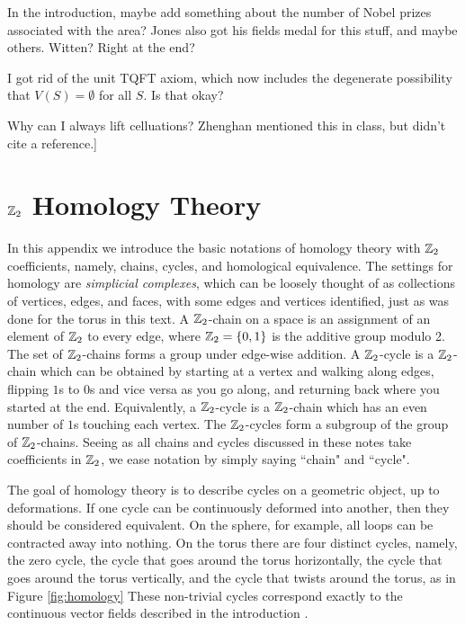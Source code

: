 \documentclass{article}
\theoremstyle{definition}
\numberwithin{figure}{section}
\begin{document}
In the introduction, maybe add something about the number of Nobel prizes associated with the area? Jones also got his fields medal for this stuff, and maybe others. Witten? Right at the end?

I got rid of the unit TQFT axiom, which now includes the degenerate possibility that $V(S)=\emptyset$ for all $S$. Is that okay?

Why can I always lift celluations? Zhenghan mentioned this in class, but didn't cite a reference.]
\appendix

\section{$\mathbb{Z}_2$ Homology Theory}
\label{Homology}

In this appendix we introduce the basic notations of homology theory with $\mathbb{Z}_2$ coefficients, namely, chains, cycles, and homological equivalence. The settings for homology are \textit{simplicial complexes}, which can be loosely thought of as collections of vertices, edges, and faces, with some edges and vertices identified, just as was done for the torus in this text. A $\mathbb{Z}_2$-chain on a space is an assignment of an element of $\mathbb{Z}_2$ to every edge, where $\mathbb{Z}_2=\{0,1\}$ is the additive group modulo 2. The set of $\mathbb{Z}_2$-chains forms a group under edge-wise addition. A $\mathbb{Z}_2$-cycle is a $\mathbb{Z}_2$-chain which can be obtained by starting at a vertex and walking along edges, flipping $1$s to $0$s and vice versa as you go along, and returning back where you started at the end. Equivalently, a $\mathbb{Z}_2$-cycle is a $\mathbb{Z}_2$-chain which has an even number of $1$s touching each vertex. The $\mathbb{Z}_2$-cycles form a subgroup of the group of $\mathbb{Z}_2$-chains. Seeing as all chains and cycles discussed in these notes take coefficients in $\mathbb{Z}_2$, we ease notation by simply saying ``chain" and ``cycle".

The goal of homology theory is to describe cycles on a geometric object, up to deformations. If one cycle can be continuously deformed into another, then they should be considered equivalent. On the sphere, for example, all loops can be contracted away into nothing. On the torus there are four distinct cycles, namely, the zero cycle, the cycle that goes around the torus horizontally, the cycle that goes around the torus vertically, and the cycle that twists around the torus, as in Figure \ref{fig:homology} These non-trivial cycles correspond exactly to the continuous vector fields described in the introduction \cite{frankel1957homology}.
\end{document}
